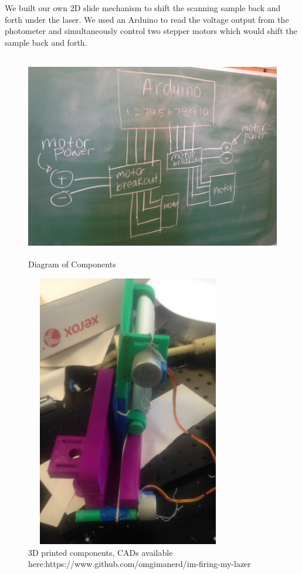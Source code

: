 \documentclass[letterpaper, 12pt]{article}
\begin{document}
\par
We built our own 2D slide mechanism to shift the scanning sample back and forth under the laser. We used an Arduino to read the voltage output from the photometer and simultaneously control two stepper motors which would shift the sample back and forth.

\begin{figure}
  \centering
  \includegraphics[width=12cm,height=9cm]{circuit}
  \caption{Diagram of Components}
\end{figure}

\begin{figure}
  \centering
  \includegraphics[width=9cm,height=12cm]{setup}
  \caption[caption]{3D printed components, CADs available here:\hspace{\textwidth}https://www.github.com/omgimanerd/im-firing-my-lazer}
\end{figure}
\end{document}
